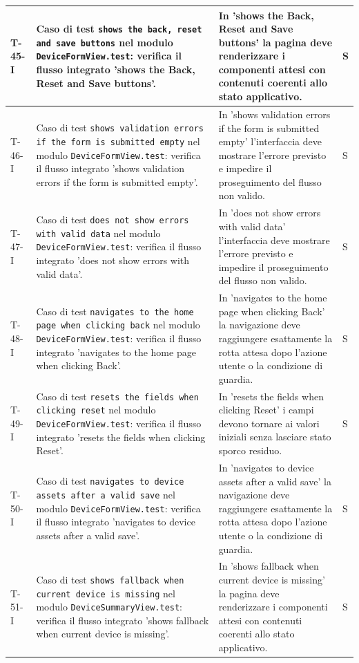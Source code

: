 \documentclass[a4paper,12pt]{article}
\begin{document}
{{\begin{longtable}{|>{\RaggedRight\arraybackslash}p{1.55cm}|>{\RaggedRight\arraybackslash}p{8.0cm}|>{\RaggedRight\arraybackslash}p{4.6cm}|>{\RaggedRight\arraybackslash}p{1.2cm}|}
        \hline
        T-45-I & Caso di test \texttt{shows the back, reset and save buttons} nel modulo \texttt{DeviceFormView.test}: verifica il flusso integrato 'shows the Back, Reset and Save buttons'. & In 'shows the Back, Reset and Save buttons' la pagina deve renderizzare i componenti attesi con contenuti coerenti allo stato applicativo. & S \\
        \hline
        T-46-I & Caso di test \texttt{shows validation errors if the form is submitted empty} nel modulo \texttt{DeviceFormView.test}: verifica il flusso integrato 'shows validation errors if the form is submitted empty'. & In 'shows validation errors if the form is submitted empty' l'interfaccia deve mostrare l'errore previsto e impedire il proseguimento del flusso non valido. & S \\
        \hline
        T-47-I & Caso di test \texttt{does not show errors with valid data} nel modulo \texttt{DeviceFormView.test}: verifica il flusso integrato 'does not show errors with valid data'. & In 'does not show errors with valid data' l'interfaccia deve mostrare l'errore previsto e impedire il proseguimento del flusso non valido. & S \\
        \hline
        T-48-I & Caso di test \texttt{navigates to the home page when clicking back} nel modulo \texttt{DeviceFormView.test}: verifica il flusso integrato 'navigates to the home page when clicking Back'. & In 'navigates to the home page when clicking Back' la navigazione deve raggiungere esattamente la rotta attesa dopo l'azione utente o la condizione di guardia. & S \\
        \hline
        T-49-I & Caso di test \texttt{resets the fields when clicking reset} nel modulo \texttt{DeviceFormView.test}: verifica il flusso integrato 'resets the fields when clicking Reset'. & In 'resets the fields when clicking Reset' i campi devono tornare ai valori iniziali senza lasciare stato sporco residuo. & S \\
        \hline
        T-50-I & Caso di test \texttt{navigates to device assets after a valid save} nel modulo \texttt{DeviceFormView.test}: verifica il flusso integrato 'navigates to device assets after a valid save'. & In 'navigates to device assets after a valid save' la navigazione deve raggiungere esattamente la rotta attesa dopo l'azione utente o la condizione di guardia. & S \\
        \hline
        T-51-I & Caso di test \texttt{shows fallback when current device is missing} nel modulo \texttt{DeviceSummaryView.test}: verifica il flusso integrato 'shows fallback when current device is missing'. & In 'shows fallback when current device is missing' la pagina deve renderizzare i componenti attesi con contenuti coerenti allo stato applicativo. & S \\

\end{longtable}}}
\end{document}
